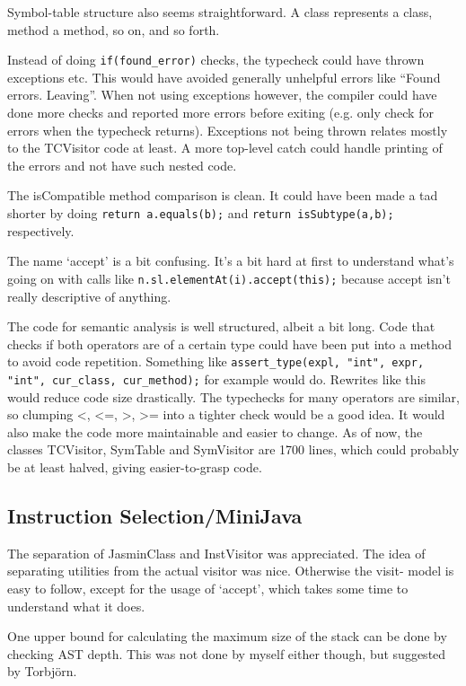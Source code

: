 \documentclass[a4paper,11pt]{article}
\begin{document}
Symbol-table structure also seems straightforward. A class represents a class,
method a method, so on, and so forth.

Instead of doing {\tt if(found\_error)} checks, the typecheck could have thrown
exceptions etc. This would have avoided generally unhelpful errors like ``Found
errors. Leaving''. When not using exceptions however, the compiler could have
done more checks and reported more errors before exiting (e.g. only check for
errors when the typecheck returns). Exceptions not being thrown relates mostly
to the TCVisitor code at least. A more top-level catch could handle printing
of the errors and not have such nested code.

The isCompatible method comparison is clean. It could have been made a tad
shorter by doing {\tt return a.equals(b);} and {\tt return isSubtype(a,b);}
respectively.

The name `accept' is a bit confusing. It's a bit hard at first to understand
what's going on with calls like {\tt n.sl.elementAt(i).accept(this);} because
accept isn't really descriptive of anything.

The code for semantic analysis is well structured, albeit a bit long. Code that
checks if both operators are of a certain type could have been put into a
method to avoid code repetition. Something like {\tt assert\_type(expl, "int",
expr, "int", cur\_class, cur\_method);} for example would do. Rewrites like
this would reduce code size drastically. The typechecks for many operators are
similar, so clumping <, <=, >, >= into a tighter check would be a good idea. It
would also make the code more maintainable and easier to change. As of now, the
classes TCVisitor, SymTable and SymVisitor are 1700 lines, which could probably
be at least halved, giving easier-to-grasp code.

\subsection*{Instruction Selection/MiniJava}

The separation of JasminClass and InstVisitor was appreciated. The idea of
separating utilities from the actual visitor was nice. Otherwise the visit-
model is easy to follow, except for the usage of `accept', which takes some
time to understand what it does.

One upper bound for calculating the maximum size of the stack can be done by
checking AST depth. This was not done by myself either though, but suggested by
Torbjörn.
\end{document}
